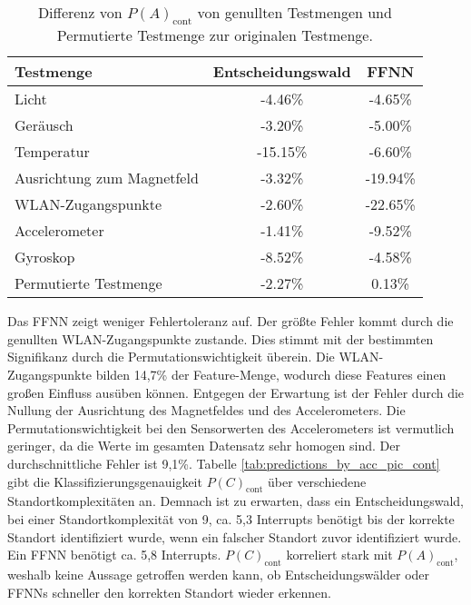 \begin{table}[h!]
    \centering
    \begin{tabular}{ | l | c | c | }
        \hline
        Testmenge & Entscheidungswald & FFNN \\\hline
        Licht & -4.46\% & -4.65\% \\\hline
        Geräusch & -3.20\% & -5.00\% \\\hline
        Temperatur & -15.15\% & -6.60\% \\\hline
        Ausrichtung zum Magnetfeld & -3.32\% & -19.94\% \\\hline
        WLAN-Zugangspunkte & -2.60\% & -22.65\% \\\hline
        Accelerometer & -1.41\% & -9.52\% \\\hline
        Gyroskop & -8.52\% & -4.58\% \\\hline
        Permutierte Testmenge & -2.27\% & 0.13\% \\\hline
    \end{tabular}
    \caption{Differenz von $P(A)_{\text{cont}}$ von genullten Testmengen und Permutierte Testmenge zur originalen Testmenge.}
    \label{tab:robustness_by_acc_cont}
\end{table}
\newline
\newline
Das FFNN zeigt weniger Fehlertoleranz auf.
Der größte Fehler kommt durch die genullten WLAN-Zugangspunkte zustande.
Dies stimmt mit der bestimmten Signifikanz durch die Permutationswichtigkeit überein.
Die WLAN-Zugangspunkte bilden 14,7\% der Feature-Menge, wodurch diese Features einen großen Einfluss ausüben können.
Entgegen der Erwartung ist der Fehler durch die Nullung der Ausrichtung des Magnetfeldes und des Accelerometers.
Die Permutationswichtigkeit bei den Sensorwerten des Accelerometers ist vermutlich geringer,
da die Werte im gesamten Datensatz sehr homogen sind.
Der durchschnittliche Fehler ist 9,1\%.
\newline
\newline
Tabelle \ref{tab:predictions_by_acc_pic_cont} gibt die Klassifizierungsgenauigkeit $P(C)_{\text{cont}}$ über verschiedene Standortkomplexitäten an.
Demnach ist zu erwarten, dass ein Entscheidungswald, bei einer Standortkomplexität von 9, ca. 5,3 Interrupts benötigt bis der korrekte Standort identifiziert wurde,
wenn ein falscher Standort zuvor identifiziert wurde.
Ein FFNN benötigt ca. 5,8 Interrupts.
$P(C)_{\text{cont}}$ korreliert stark mit $P(A)_{\text{cont}}$, weshalb keine Aussage getroffen werden kann, ob Entscheidungswälder oder FFNNs schneller den korrekten Standort wieder erkennen.
